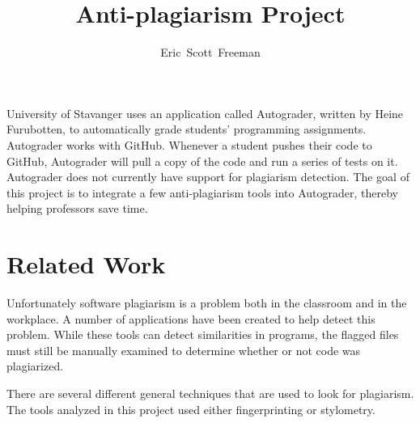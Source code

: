 \documentclass[10pt,journal,compsoc]{IEEEtran}
\begin{document}
	\title{Anti-plagiarism Project}
	\author{Eric~Scott~Freeman}


	\maketitle
	\IEEEdisplaynontitleabstractindextext
	\IEEEpeerreviewmaketitle

	
	 University of Stavanger uses an application called Autograder, written by Heine Furubotten, to automatically grade students' programming assignments. Autograder works with GitHub. Whenever a student pushes their code to GitHub, Autograder will pull a copy of the code and run a series of tests on it. Autograder does not currently have support for plagiarism detection. The goal of this project is to integrate a few anti-plagiarism tools into Autograder, thereby helping professors save time.

	\section{Related Work}
	Unfortunately software plagiarism is a problem both in the classroom and in the workplace. A number of applications have been created to help detect this problem. While these tools can detect similarities in programs, the flagged files must still be manually examined to determine whether or not code was plagiarized.
		
	There are several different general techniques that are used to look for plagiarism. The tools analyzed in this project used either fingerprinting or stylometry.
		
\end{document}

